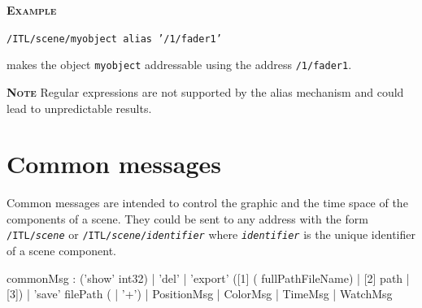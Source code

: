 \documentclass[a4paper,twoside]{report}
\newcommand{\toplevel}[1]	{\chapter{#1}}
\newcommand{\OSC}[1]		{\texttt{#1}}
\newcommand{\example}		{\textbf{\hspace{-1.5cm}\textbf{\textsc{Example }}}}
\newcommand{\note}	[1]		{\vspace{2mm}\textbf{\hspace{-1.03cm}\textbf{\textsc{Note #1}}}}
\newcommand{\sample}	[1]			{\vspace{-2mm}\begin{center}\colorbox{mygrey}{
								\begin{minipage}[t]{0.9\columnwidth} 
								{\small \texttt{#1}}
								\end{minipage}}\end{center}}
\newcommand{\sampleindent}	{ \hspace{0.5cm} }
\begin{document}
\example
\sample{/ITL/scene/myobject alias '/1/fader1'}
\sampleindent makes the object \OSC{myobject} addressable using the address \OSC{/1/fader1}.

\note{} Regular expressions are not supported by the alias mechanism and could lead to unpredictable results.



\toplevel{Common messages}
\label{common}
Common messages are intended to control the graphic and the time space of the components of a scene.
They could be sent to any address with the form \OSC{/ITL/\textit{scene}} or \OSC{/ITL/\textit{scene}/\textit{identifier}} where \OSC{\textit{identifier}} is the unique identifier of a scene component.
\begin{rail}
commonMsg :  ('show' int32)
			| 'del'
			| 'export' ([1] ( fullPathFileName) | [2] path | [3])
			| 'save' filePath ( | '+')
			| PositionMsg
			| ColorMsg
			| TimeMsg
			| WatchMsg
\end{rail}
\end{document}
